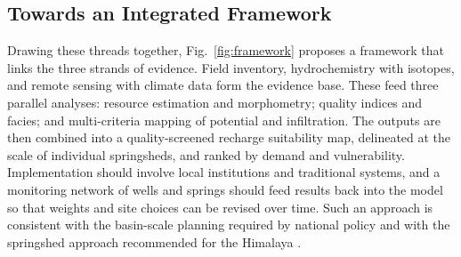 \documentclass[10pt,a4paper,twocolumn]{article}
\begin{document}
\subsection{Towards an Integrated Framework}

Drawing these threads together, Fig.~\ref{fig:framework} proposes a framework that links the
three strands of evidence. Field inventory, hydrochemistry with isotopes, and remote sensing
with climate data form the evidence base. These feed three parallel analyses: resource
estimation and morphometry; quality indices and facies; and multi-criteria mapping of
potential and infiltration. The outputs are then combined into a quality-screened recharge
suitability map, delineated at the scale of individual springsheds, and ranked by demand and
vulnerability. Implementation should involve local institutions and traditional systems, and a
monitoring network of wells and springs should feed results back into the model so that
weights and site choices can be revised over time. Such an approach is consistent with the
basin-scale planning required by national policy \citep{mowr2002} and with the springshed
approach recommended for the Himalaya \citep{niti2018,tambe2012}.
\end{document}
